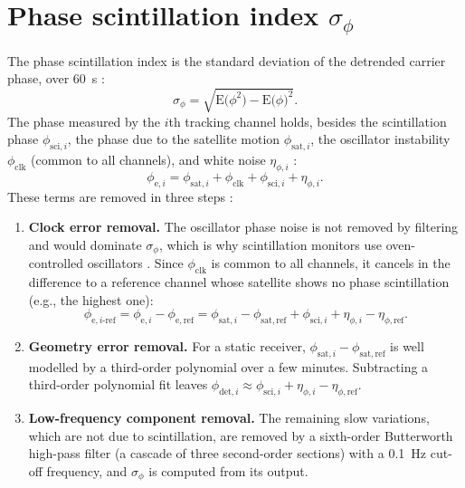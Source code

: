 \documentclass{article}
\begin{document}
\section{Phase scintillation index \texorpdfstring{$\sigma_\phi$}{sigma-phi}}
\label{sec:sigma-phi}

The phase scintillation index is the standard deviation of the detrended carrier phase, over 60~s \cite{vandierendonckMeasuringIonosphericScintillation2004}:
\begin{equation}
  \sigma_\phi = \sqrt{\mathrm{E}\big(\phi^2\big) - \mathrm{E}\big(\phi\big)^2}.
\end{equation}
The phase measured by the $i$th tracking channel holds, besides the scintillation phase $\phi_{\mathrm{sci},i}$, the phase due to the satellite motion $\phi_{\mathrm{sat},i}$, the oscillator instability $\phi_\mathrm{clk}$ (common to all channels), and white noise $\eta_{\phi,i}$ \cite{wendlerScintillationProcessingSoftware2016}:
\begin{equation}
  \phi_{\mathrm{e},i} = \phi_{\mathrm{sat},i} + \phi_\mathrm{clk} + \phi_{\mathrm{sci},i} + \eta_{\phi,i}.
\end{equation}
These terms are removed in three steps \cite{wendlerScintillationProcessingSoftware2016}:
\begin{enumerate}
  \item \textbf{Clock error removal.} The oscillator phase noise is not removed by filtering and would dominate $\sigma_\phi$, which is why scintillation monitors use oven-controlled oscillators \cite{vandierendonckIonosphericScintillationMonitoring1993}. Since $\phi_\mathrm{clk}$ is common to all channels, it cancels in the difference to a reference channel whose satellite shows no phase scintillation (e.g., the highest one):
  \begin{equation}
    \phi_{\mathrm{e},i\text{-ref}} = \phi_{\mathrm{e},i} - \phi_{\mathrm{e,ref}} = \phi_{\mathrm{sat},i} - \phi_{\mathrm{sat,ref}} + \phi_{\mathrm{sci},i} + \eta_{\phi,i} - \eta_{\phi,\mathrm{ref}}.
  \end{equation}
  \item \textbf{Geometry error removal.} For a static receiver, $\phi_{\mathrm{sat},i} - \phi_{\mathrm{sat,ref}}$ is well modelled by a third-order polynomial over a few minutes. Subtracting a third-order polynomial fit leaves $\phi_{\mathrm{det},i} \approx \phi_{\mathrm{sci},i} + \eta_{\phi,i} - \eta_{\phi,\mathrm{ref}}$.
  \item \textbf{Low-frequency component removal.} The remaining slow variations, which are not due to scintillation, are removed by a sixth-order Butterworth high-pass filter (a cascade of three second-order sections) with a 0.1~Hz cut-off frequency, and $\sigma_\phi$ is computed from its output.
\end{enumerate}
\end{document}
